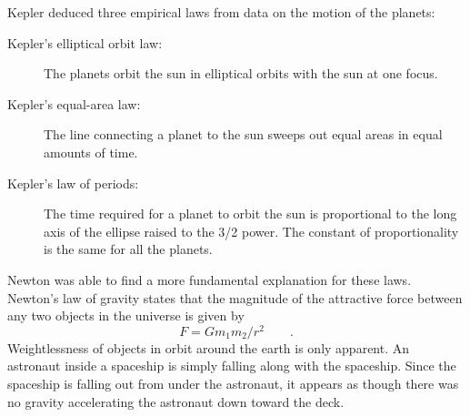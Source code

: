 \begin{summary}

\begin{vocab}






\end{vocab}

\begin{notation}


\end{notation}

\begin{summarytext}

Kepler deduced three empirical laws from data on the
motion of the planets:
\begin{description}
  \item[Kepler's elliptical orbit law:] The planets orbit the sun in
  elliptical orbits with the sun at one focus.
  \item[Kepler's equal-area law:] The line connecting a planet to the
  sun sweeps out equal areas in equal amounts of time.
  \item[Kepler's law of periods:] The time required for a planet to
  orbit the sun is proportional to the long axis of the
  ellipse raised to the 3/2 power. The constant of proportionality
  is the same for all the planets.
\end{description}
Newton was able to find a more fundamental explanation for
these laws. Newton's law of gravity states that the
magnitude of the attractive force between any two objects in
the universe is given by
\begin{equation*}
F=Gm_1m_2/r^2   \qquad   .
\end{equation*}
Weightlessness of objects in orbit around the earth is only
apparent. An astronaut inside a spaceship is simply falling
along with the spaceship. Since the spaceship is falling out
from under the astronaut, it appears as though there was no
gravity accelerating the astronaut down toward the deck.


\end{summarytext}
\end{summary}
